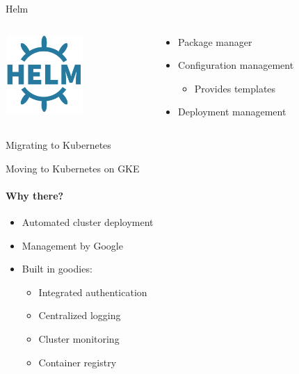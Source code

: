\documentclass[17pt]{beamer}
\newcommand{\imageframe}[2]{{
  \usebackgroundtemplate{\texttt{[image: \#1]}}
  \begin{frame}{\vspace{-6pt}\usebeamercolor[fg]{item}#2}
  \end{frame}
}}
\begin{document}
  \begin{frame}{Helm}
    \begin{columns}[c]
      \begin{column}{.2\textwidth}
          \includegraphics[width=3cm,height=3cm]{images/helm_logo.png}
      \end{column}
      \begin{column}{.8\textwidth}
        \begin{itemize}
          \item Package manager
          \item Configuration management
          \begin{itemize}
            \item Provides templates
          \end{itemize}
          \item Deployment management
        \end{itemize}
      \end{column}
    \end{columns}
  \end{frame}


  \imageframe{images/migrating_cranes.jpg}{Migrating to Kubernetes}

  \begin{frame}{Moving to Kubernetes on GKE}
  \framesubtitle{Why there?}
  \begin{itemize}
    \item Automated cluster deployment
    \item Management by Google
    \item Built in goodies:
    \begin{itemize}
      \item Integrated authentication
      \item Centralized logging
      \item Cluster monitoring
      \item Container registry
    \end{itemize}
  \end{itemize}
  \end{frame}
\end{document}
